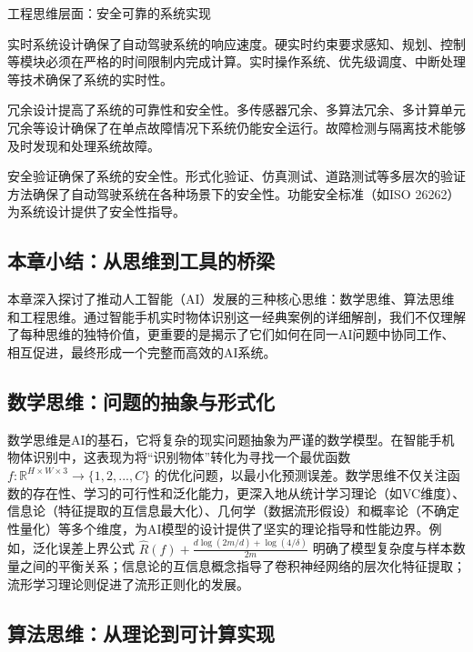 工程思维层面：安全可靠的系统实现

实时系统设计确保了自动驾驶系统的响应速度。硬实时约束要求感知、规划、控制等模块必须在严格的时间限制内完成计算。实时操作系统、优先级调度、中断处理等技术确保了系统的实时性。

冗余设计提高了系统的可靠性和安全性。多传感器冗余、多算法冗余、多计算单元冗余等设计确保了在单点故障情况下系统仍能安全运行。故障检测与隔离技术能够及时发现和处理系统故障。

安全验证确保了系统的安全性。形式化验证、仿真测试、道路测试等多层次的验证方法确保了自动驾驶系统在各种场景下的安全性。功能安全标准（如ISO 26262）为系统设计提供了安全性指导。

\subsection*{本章小结：从思维到工具的桥梁}

本章深入探讨了推动人工智能（AI）发展的三种核心思维：数学思维、算法思维和工程思维。通过智能手机实时物体识别这一经典案例的详细解剖，我们不仅理解了每种思维的独特价值，更重要的是揭示了它们如何在同一AI问题中协同工作、相互促进，最终形成一个完整而高效的AI系统。

\subsection*{数学思维：问题的抽象与形式化}

数学思维是AI的基石，它将复杂的现实问题抽象为严谨的数学模型。在智能手机物体识别中，这表现为将“识别物体”转化为寻找一个最优函数 $f: \mathbb{R}^{H \times W \times 3} \to \{1,2,...,C\}$ 的优化问题，以最小化预测误差。数学思维不仅关注函数的存在性、学习的可行性和泛化能力，更深入地从统计学习理论（如VC维度）、信息论（特征提取的互信息最大化）、几何学（数据流形假设）和概率论（不确定性量化）等多个维度，为AI模型的设计提供了坚实的理论指导和性能边界。例如，泛化误差上界公式 $\hat{R}(f) + \frac{d \log(2m/d) + \log(4/\delta)}{2m}$ 明确了模型复杂度与样本数量之间的平衡关系；信息论的互信息概念指导了卷积神经网络的层次化特征提取；流形学习理论则促进了流形正则化的发展。

\subsection*{算法思维：从理论到可计算实现}

